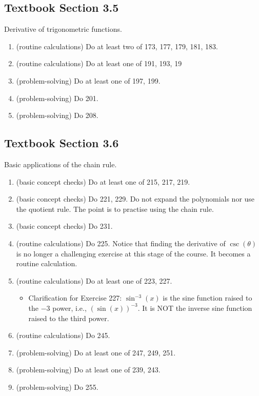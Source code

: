 \documentclass[../main.tex]{subfiles}
\begin{document}
\subsection*{Textbook Section 3.5}

Derivative of trigonometric functions.
\begin{enumerate}
  \item (routine calculations) Do at least two of 173, 177, 179, 181, 183.
  \item (routine calculations) Do at least one of 191, 193, 19
  \item (problem-solving) Do at least one of 197, 199.
  \item (problem-solving) Do 201.
  \item (problem-solving) Do 208.
\end{enumerate}

\clearpage
\subsection*{Textbook Section 3.6}

Basic applications of the chain rule.
\begin{enumerate}
  \item (basic concept checks) Do at least one of 215, 217, 219.
  \item (basic concept checks) Do 221, 229. Do not expand the polynomials nor use the quotient rule. The point is to practise using the chain rule.
  \item (basic concept checks) Do 231.
  \item (routine calculations) Do 225.  Notice that finding the derivative of \(\csc(\theta)\) is no longer a challenging exercise at this stage of the course. It becomes a routine calculation.
  \item (routine calculations) Do at least one of 223, 227.
    \begin{itemize}
      \item Clarification for Exercise 227: \(\sin^{-3}(x)\) is the sine function raised to the \(-3\) power, i.e., \((\sin(x))^{-3}\). It is NOT the inverse sine function raised to the third power.
    \end{itemize}
  \item (routine calculations) Do 245.
  \item (problem-solving) Do at least one of 247, 249, 251.
  \item (problem-solving) Do at least one of 239, 243.
  \item (problem-solving) Do 255.
\end{enumerate}
\end{document}
